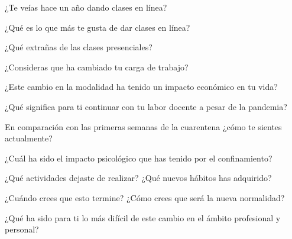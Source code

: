 \documentclass[spanish]{textolivre}
\begin{document}
¿Te veías hace un año dando clases en línea?

¿Qué es lo que más te gusta de dar clases en línea?

¿Qué extrañas de las clases presenciales?

¿Consideras que ha cambiado tu carga de trabajo?

¿Este cambio en la modalidad ha tenido un impacto económico en tu vida?

¿Qué significa para ti continuar con tu labor docente a pesar de la pandemia? 

En comparación con las primeras semanas de la cuarentena ¿cómo te sientes actualmente?

¿Cuál ha sido el impacto psicológico que has tenido por el confinamiento?

¿Qué actividades dejaste de realizar?  ¿Qué nuevos hábitos has adquirido?

¿Cuándo crees que esto termine? ¿Cómo crees que será la nueva normalidad?

¿Qué ha sido para ti lo más difícil de este cambio en el ámbito profesional y personal?
\end{document}
